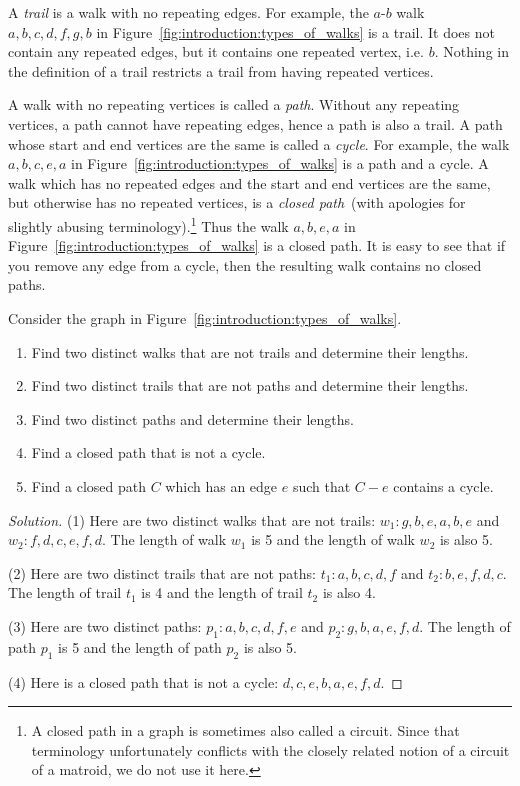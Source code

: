 A \emph{trail} is a walk with no repeating edges. For example, the
$a$-$b$ walk $a, b, c, d, f, g, b$ in
Figure~\ref{fig:introduction:types_of_walks} is a trail. It does not
contain any repeated edges, but it contains one repeated vertex,
i.e. $b$. Nothing in the definition of a trail restricts a trail from
having repeated vertices.

A walk with no repeating vertices is called a \emph{path}. Without any
repeating vertices, a path cannot have repeating edges, hence a path
is also a trail. A path whose start and end vertices are the same is
called a \emph{cycle}. For example, the walk $a, b, c, e, a$
in Figure~\ref{fig:introduction:types_of_walks} is a path and a cycle.
A walk which has no repeated edges and the start and end vertices are
the same, but otherwise has no  repeated vertices, is
a \emph{closed path}~(with apologies for slightly abusing
terminology).\footnote{
A closed path in a graph is sometimes also called a circuit. Since
that terminology unfortunately conflicts with the closely related
notion of a circuit of a matroid, we do not use it here.}
Thus the walk $a, b, e, a$ in
Figure~\ref{fig:introduction:types_of_walks} is a closed path. It is
easy to see that if you remove any edge from a cycle, then the
resulting walk contains no closed paths.

\begin{exercise}
Consider the graph in Figure~\ref{fig:introduction:types_of_walks}.
%
\begin{enumerate}
\item Find two distinct walks that are not trails and determine their
  lengths.

\item Find two distinct trails that are not paths and determine their
  lengths.

\item Find two distinct paths and determine their lengths.

\item Find a closed path that is not a cycle.

\item Find a closed path $C$ which has an edge $e$ such that $C - e$
  contains a cycle.
\end{enumerate}
\end{exercise}

\begin{proof}[Solution]
(1) Here are two distinct walks that are not trails:
$w_1: g, b, e, a, b, e$ and $w_2: f, d, c, e, f, d$. The length of
walk $w_1$ is 5 and the length of walk $w_2$ is also 5.

(2) Here are two distinct trails that are not paths:
$t_1: a, b, c, d, f$ and $t_2: b, e, f, d, c$. The length of trail
$t_1$ is 4 and the length of trail $t_2$ is also 4.

(3) Here are two distinct paths: $p_1: a, b, c, d, f, e$ and
$p_2: g, b, a, e, f, d$. The length of path $p_1$ is 5 and the length
of path $p_2$ is also 5.

(4) Here is a closed path that is not a cycle: $d, c, e, b, a, e, f, d$.
\end{proof}

